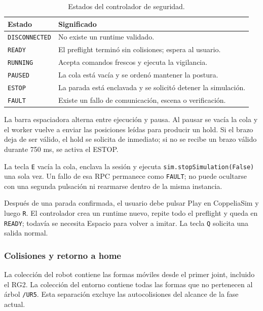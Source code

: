 \begin{table}[H]
    \centering
    \renewcommand{\arraystretch}{1.2}
    \small
    \begin{tabularx}{\textwidth}{p{3cm} X}
        \toprule
        \textbf{Estado} & \textbf{Significado} \\
        \midrule
        \texttt{DISCONNECTED} & No existe un runtime validado. \\
        \texttt{READY} & El preflight terminó sin colisiones; espera al usuario. \\
        \texttt{RUNNING} & Acepta comandos frescos y ejecuta la vigilancia. \\
        \texttt{PAUSED} & La cola está vacía y se ordenó mantener la postura. \\
        \texttt{ESTOP} & La parada está enclavada y se solicitó detener la simulación. \\
        \texttt{FAULT} & Existe un fallo de comunicación, escena o verificación. \\
        \bottomrule
    \end{tabularx}
    \caption{Estados del controlador de seguridad.}
    \label{tab:estados_seguridad}
\end{table}

La barra espaciadora alterna entre ejecución y pausa. Al pausar se vacía la
cola y el worker vuelve a enviar las posiciones leídas para producir un hold.
Si el brazo deja de ser válido, el hold se solicita de inmediato; si no se
recibe un brazo válido durante 750 ms, se activa el ESTOP.

La tecla \texttt{E} vacía la cola, enclava la sesión y ejecuta
\texttt{sim.stopSimulation(False)} una sola vez. Un fallo de esa RPC permanece
como \texttt{FAULT}; no puede ocultarse con una segunda pulsación ni rearmarse
dentro de la misma instancia.

Después de una parada confirmada, el usuario debe pulsar Play en CoppeliaSim y
luego \texttt{R}. El controlador crea un runtime nuevo, repite todo el preflight
y queda en \texttt{READY}; todavía se necesita Espacio para volver a imitar.
La tecla \texttt{Q} solicita una salida normal.

\subsubsection*{Colisiones y retorno a home}

La colección del robot contiene las formas móviles desde el primer joint,
incluido el RG2. La colección del entorno contiene todas las formas que no
pertenecen al árbol \texttt{/UR5}. Esta separación excluye las autocolisiones
del alcance de la fase actual.

